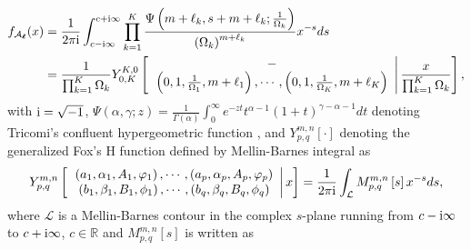 \documentclass[12pt,onecolumn,draftcls]{IEEEtran}
\newcommand{\bs}{\boldsymbol}
\newtheorem{mydef}{Definition}
\begin{document}
\begin{align}\label{eqn:pdf_produc_gamma_ind_sec}
{f_{{{ {\mathcal A}}_{\bs{\ell}}}}}(x) &= \frac{1}{{2\pi {\rm{i}}}}\int\nolimits_{c - {\rm{i}}\infty }^{c + {\rm{i}}\infty } {\prod\limits_{k = 1}^K {\frac{{\Psi \left( {m + {\ell_k},s + m + {\ell_k};\frac{1}{{{\Omega _k}}}} \right)}}{{{{\left( {{\Omega _k}} \right)}^{m + {\ell_k}}}}}} {x^{ - s}}ds}\notag\\
&= \frac{1}{{\prod\nolimits_{k = 1}^K {{\Omega _k}} }}Y_{0,K}^{K,0}\left[ {\left. {\begin{array}{*{20}{c}}
 - \\
{\left( {0,1,\frac{1}{{{\Omega _1}}},m + {\ell_1}} \right), \cdots ,\left( {0,1,\frac{1}{{{\Omega _K}}},m + {\ell_K}} \right)}
\end{array}} \right|\frac{x}{{\prod\nolimits_{k = 1}^K {{\Omega _k}} }}} \right],
\end{align}
with ${\rm i} = \sqrt{-1}$, $\Psi \left( {\alpha ,\gamma ;z} \right) = \frac{1}{{\Gamma \left( \alpha  \right)}}\int\nolimits_0^\infty  {{e^{ - zt}}{t^{\alpha  - 1}}{{\left( {1 + t} \right)}^{\gamma  - \alpha  - 1}}dt}$ denoting Tricomi's confluent hypergeometric function \cite[Eq.9.211.4]{gradshteyn1965table}, and $Y_{p,q}^{m,n}[\cdot]$ denoting the generalized Fox's H function defined by Mellin-Barnes integral as \cite{yilmaz2010outage,chelli2013performance}
\begin{equation}\label{eqn_fox_h_def}
Y_{p,q}^{m,n}\left[ {\left. {\begin{array}{*{20}{c}}
{\left( {{a_1},{\alpha _1},{ A_1},{\varphi _1}} \right), \cdots ,\left( {{a_p},{\alpha _p},{ A_p},{\varphi _p}} \right)}\\
{\left( {{b_1},{\beta _1},{B_1},{\phi _1}} \right), \cdots ,\left( {{b_q},{\beta _q},{B_q},{\phi _q}} \right)}
\end{array}} \right|x} \right] = \frac{1}{{2\pi {\rm i}}}\int_{\mathcal L} {M_{p,q}^{m,n}\left[ s \right]{x^{ - s}}ds},
\end{equation}
where $\mathcal{L}$ is a Mellin-Barnes contour in the complex $s$-plane running from $c-{\rm i}\infty $ to $c+{\rm i}\infty$, $c \in \mathbb{R}$ and $M_{p,q}^{m,n}\left[ s \right]$ is written as
\end{document}
